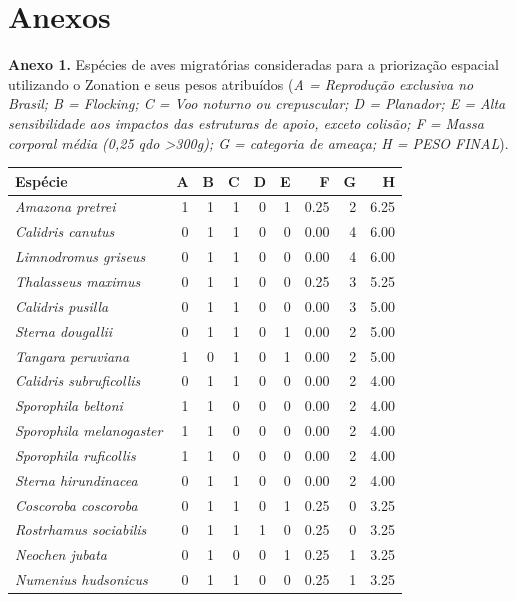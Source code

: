 \documentclass[
  oneside]{scrbook}
\begin{document}
\hypertarget{anexos}{%
\chapter*{Anexos}\label{anexos}}

\textbf{Anexo 1.} Espécies de aves migratórias consideradas para a priorização espacial utilizando o Zonation e seus pesos atribuídos (\emph{A = Reprodução exclusiva no Brasil; B = Flocking; C = Voo noturno ou crepuscular; D = Planador; E = Alta sensibilidade aos impactos das estruturas de apoio, exceto colisão; F = Massa corporal média (0,25 qdo \textgreater300g); G = categoria de ameaça; H = PESO FINAL}).

\begin{longtable}{>{}lrrrrrrrr}
\toprule
Espécie & A & B & C & D & E & F & G & H\\
\midrule
\em{Amazona pretrei} & 1 & 1 & 1 & 0 & 1 & 0.25 & 2 & 6.25\\
\em{Calidris canutus} & 0 & 1 & 1 & 0 & 0 & 0.00 & 4 & 6.00\\
\em{Limnodromus griseus} & 0 & 1 & 1 & 0 & 0 & 0.00 & 4 & 6.00\\
\em{Thalasseus maximus} & 0 & 1 & 1 & 0 & 0 & 0.25 & 3 & 5.25\\
\em{Calidris pusilla} & 0 & 1 & 1 & 0 & 0 & 0.00 & 3 & 5.00\\
\addlinespace
\em{Sterna dougallii} & 0 & 1 & 1 & 0 & 1 & 0.00 & 2 & 5.00\\
\em{Tangara peruviana} & 1 & 0 & 1 & 0 & 1 & 0.00 & 2 & 5.00\\
\em{Calidris subruficollis} & 0 & 1 & 1 & 0 & 0 & 0.00 & 2 & 4.00\\
\em{Sporophila beltoni} & 1 & 1 & 0 & 0 & 0 & 0.00 & 2 & 4.00\\
\em{Sporophila melanogaster} & 1 & 1 & 0 & 0 & 0 & 0.00 & 2 & 4.00\\
\addlinespace
\em{Sporophila ruficollis} & 1 & 1 & 0 & 0 & 0 & 0.00 & 2 & 4.00\\
\em{Sterna hirundinacea} & 0 & 1 & 1 & 0 & 0 & 0.00 & 2 & 4.00\\
\em{Coscoroba coscoroba} & 0 & 1 & 1 & 0 & 1 & 0.25 & 0 & 3.25\\
\em{Rostrhamus sociabilis} & 0 & 1 & 1 & 1 & 0 & 0.25 & 0 & 3.25\\
\em{Neochen jubata} & 0 & 1 & 0 & 0 & 1 & 0.25 & 1 & 3.25\\
\addlinespace
\em{Numenius hudsonicus} & 0 & 1 & 1 & 0 & 0 & 0.25 & 1 & 3.25\\

\end{longtable}
\end{document}
